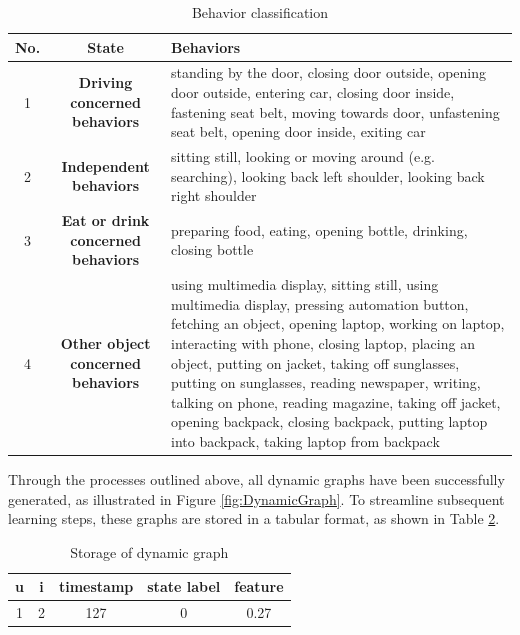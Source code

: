\begin{table}[h]
    \centering
    \begin{tabular}{ccp{10cm}}
        \toprule
        \textbf{No.} & \textbf{State} & \textbf{Behaviors} \\
        \midrule
        1 & \textbf{Driving concerned behaviors} & standing by the door, closing door outside, opening door outside, entering car, closing door inside, fastening seat belt, moving towards door, unfastening seat belt, opening door inside, exiting car \\
        \midrule
        2 & \textbf{Independent behaviors} & sitting still, looking or moving around (e.g. searching), looking back left shoulder, looking back right shoulder \\
        \midrule
        3 & \textbf{Eat or drink concerned behaviors} & preparing food, eating, opening bottle, drinking, closing bottle \\
        \midrule
        4 & \textbf{Other object concerned behaviors} & using multimedia display, sitting still, using multimedia display, pressing automation button, fetching an object, opening laptop, working on laptop, interacting with phone, closing laptop, placing an object, putting on jacket, taking off sunglasses, putting on sunglasses, reading newspaper, writing, talking on phone, reading magazine, taking off jacket, opening backpack, closing backpack, putting laptop into backpack, taking laptop from backpack \\
        \bottomrule
    \end{tabular}
    \caption{Behavior classification}
    \label{tab:Behavior classification}
\end{table}



Through the processes outlined above, all dynamic graphs have been successfully generated, as illustrated in Figure \ref{fig:DynamicGraph}. To streamline subsequent learning steps, these graphs are stored in a tabular format, as shown in Table \ref{tab:dynamic_graph_storage}.



\begin{table}[h]
    \centering
    \begin{tabular}{ccccc}
        \toprule
        \textbf{u} & \textbf{i} & \textbf{timestamp} & \textbf{state label} & \textbf{feature} \\
        \midrule
        1 & 2 & 127 & 0 & 0.27 \\
        \bottomrule
    \end{tabular}
    \caption{Storage of dynamic graph}
    \label{tab:dynamic_graph_storage}
\end{table}

